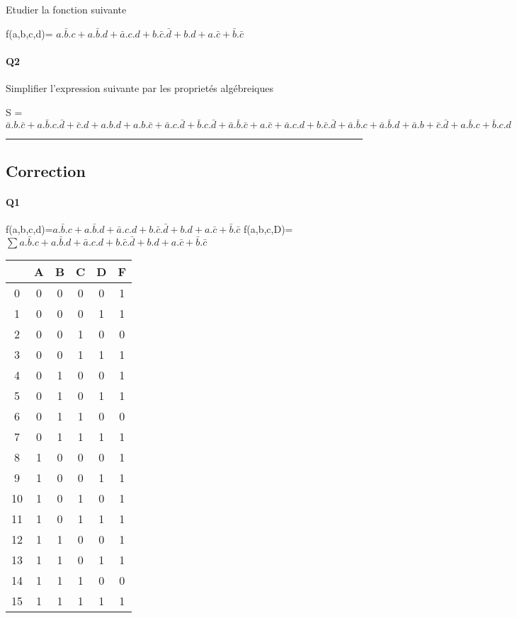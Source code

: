 Etudier la fonction suivante

f(a,b,c,d)= $a.\bar b.c+a.\bar b.d+\bar a.c.d+b.\bar c.\bar d + b.d+a.\bar c+\bar b.\bar c$

\paragraph{Q2}

Simplifier l'expression suivante par les proprietés algébreiques 

S = $\bar a.b.\bar c+a.\bar b.c.\bar d + \bar c.d+a.b.d+a.b.\bar c+\bar a.c.\bar d+\bar b.c.\bar d+\bar a.\bar b.\bar c + a.\bar c+\bar a.c.d+b.\bar c.\bar d+\bar a.\bar b.c+\bar a.\bar b.d + \bar a.b+\bar c.\bar d+a.\bar b.c+\bar b.c.d$

\hrule width 1\linewidth\pagebreak
\subsection{Correction}

\paragraph{Q1}

f(a,b,c,d)=$a.\bar b.c+a.\bar b.d+\bar a.c.d+b.\bar c.\bar d + b.d+a.\bar c+\bar b.\bar c$
f(a,b,c,D)=$ \sum a.\bar b.c+a.\bar b.d+\bar a.c.d+b.\bar c.\bar d + b.d+a.\bar c+\bar b.\bar c $ 

        \begin{tabular}{|c|c|c|c|c||c|}
    \toprule
         & A & B & C & D & F\\ \midrule0 & 0 & 0 & 0 & 0 & 1\\1 & 0 & 0 & 0 & 1 & 1\\2 & 0 & 0 & 1 & 0 & 0\\3 & 0 & 0 & 1 & 1 & 1\\\midrule4 & 0 & 1 & 0 & 0 & 1\\5 & 0 & 1 & 0 & 1 & 1\\6 & 0 & 1 & 1 & 0 & 0\\7 & 0 & 1 & 1 & 1 & 1\\\midrule8 & 1 & 0 & 0 & 0 & 1\\9 & 1 & 0 & 0 & 1 & 1\\10 & 1 & 0 & 1 & 0 & 1\\11 & 1 & 0 & 1 & 1 & 1\\\midrule12 & 1 & 1 & 0 & 0 & 1\\13 & 1 & 1 & 0 & 1 & 1\\14 & 1 & 1 & 1 & 0 & 0\\15 & 1 & 1 & 1 & 1 & 1\\\bottomrule
        \end{tabular}
        
